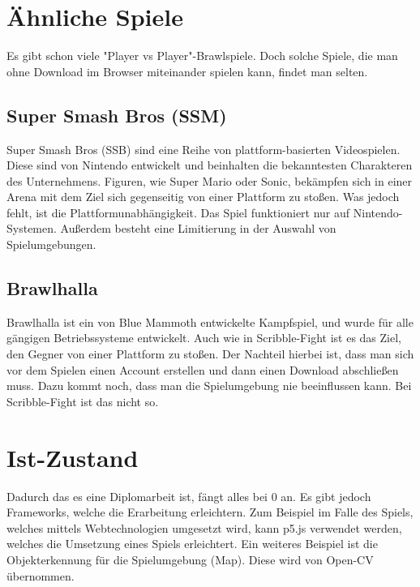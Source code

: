 \section{Ähnliche Spiele}
Es gibt schon viele "Player vs Player"-Brawlspiele. Doch solche Spiele, die man ohne Download im Browser
miteinander spielen kann, findet man selten. 

\subsection{Super Smash Bros (SSM)}
Super Smash Bros (SSB) sind eine Reihe von plattform-basierten Videospielen.
Diese sind von Nintendo entwickelt und beinhalten die bekanntesten Charakteren des Unternehmens.
Figuren, wie Super Mario oder Sonic, bekämpfen sich in einer Arena mit dem Ziel sich gegenseitig 
von einer Plattform zu stoßen.
Was jedoch fehlt, ist die Plattformunabhängigkeit. 
Das Spiel funktioniert nur auf Nintendo-Systemen.
Außerdem besteht eine Limitierung in der Auswahl von Spielumgebungen.

\subsection{Brawlhalla}
Brawlhalla ist ein von Blue Mammoth entwickelte Kampfspiel, und wurde für alle gängigen Betriebssysteme entwickelt. 
Auch wie in Scribble-Fight ist es das Ziel, den Gegner von einer Plattform zu stoßen.
Der Nachteil hierbei ist, dass man sich vor dem Spielen einen Account erstellen
und dann einen Download abschließen muss. Dazu kommt noch, dass man die Spielumgebung nie beeinflussen kann.
Bei Scribble-Fight ist das nicht so. 


\section{Ist-Zustand}
Dadurch das es eine Diplomarbeit ist, fängt alles bei 0 an. Es gibt jedoch Frameworks,
welche die Erarbeitung erleichtern. Zum Beispiel im Falle des Spiels, welches
mittels Webtechnologien umgesetzt wird, kann p5.js verwendet werden, welches die
Umsetzung eines Spiels erleichtert. Ein weiteres Beispiel ist die Objekterkennung für
die Spielumgebung (Map). Diese wird von Open-CV übernommen.